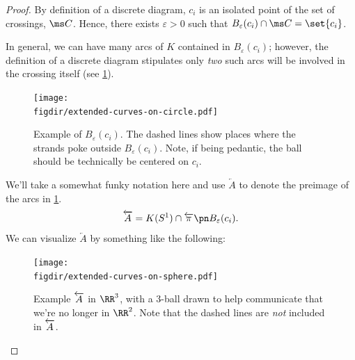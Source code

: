 \begin{proof}
  By definition of a discrete diagram, $c_i$ is an isolated point of
  the set of crossings, $\ms C$. Hence, there exists $\varepsilon > 0$
  such that $B_{\varepsilon}(c_i) \cap \ms C = \set{c_i}$.

  In general, we can have many arcs of $K$ contained in
  $B_{\varepsilon}(c_i)$; however, the definition of a discrete
  diagram stipulates only \emph{two} such arcs will be involved in the
  crossing itself (see \cref{fig:ex-b-veps}).
  \begin{figure}[H]
    \centering
    \hspace{-1cm}
    \texttt{[image: \\figdir/extended-curves-on-circle.pdf]}
    \caption{Example of $B_{\varepsilon}(c_i)$. The dashed lines show
      places where the strands poke outside $B_{\varepsilon}(c_i)$.
      Note, if being pedantic, the ball should be technically be
      centered on $c_i$.}
    \label{fig:ex-b-veps} %
  \end{figure}
  We'll
  take a somewhat funky notation here and use $\overleftarrow{A}$ to
  denote the preimage of the arcs in \cref{fig:ex-b-veps}.
  \[
    \overleftarrow{A} = K(S^1) \cap \fpre{\pi}{B_{\varepsilon}(c_i)}.
  \]
  We can visualize $\overleftarrow{A}$ by something like the
  following:
  \begin{figure}[H]
    \centering
    \texttt{[image: \\figdir/extended-curves-on-sphere.pdf]}
    \caption{Example $\protect\overleftarrow{A}$ in $\RR^3$, with a
      3-ball drawn to help communicate that we're no longer in
      $\RR^2$. Note that the dashed lines are \emph{not} included in
      $\protect\overleftarrow{A}$.}
  \end{figure}



\end{proof}
